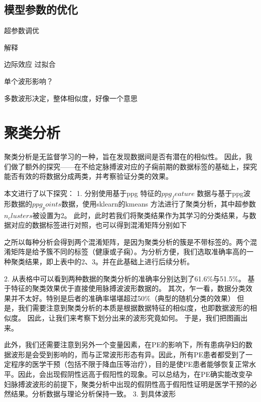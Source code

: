 \subsection{模型参数的优化}



超参数调优


解释

边际效应
过拟合

单个波形影响？

多数波形决定，整体相似度，好像一个意思



\subsection{}



\section{聚类分析}
聚类分析是无监督学习的一种，旨在发现数据间是否有潜在的相似性\cite{Liu2018,Li2017}。
因此，我们做了额外的探究——在不给定脉搏波对应的子痫前期的数据标签的基础上，探究能否有效的将数据分成两类，并考察验证分类的效果。

本文进行了以下探究：
1.	分别使用基于ppg 特征的$ppg_feature$ 数据与基于ppg波形数据的$ppg_points $数据，使用sklearn的kmeans 方法进行了聚类分析，其中超参数$n_clusters$被设置为2。
此时，此时若我们将聚类结果作为其学习的分类结果，与数据对应的数据标签进行对照，也可以得到混淆矩阵分别如下

之所以每种分析会得到两个混淆矩阵，是因为聚类分析的簇是不带标签的。两个混淆矩阵是给予簇不同的标签（健康或子痫）。为分析方便，我们选取准确率高的一种聚类结果，即上表中的2、3。并在此基础上进行后续分析。

2.	从表格中可以看到两种数据的聚类分析的准确率分别达到了61.6\%与51.5\%。
基于特征的聚类效果优于直接使用脉搏波波形数据的。
其次，乍一看，数据分类效果并不太好。特别是后者的准确率堪堪超过50\%（典型的随机分类的效果）
但是，我们需要注意到聚类分析的本质是根据数据特征的相似度，也即数据波形的相似度。
因此，让我们来考察下划分出来的波形究竟如何。
于是，我们把图画出来。

此外，我们还需要注意到另外一个变量因素，在PE的影响下，所有患病孕妇的数据波形是会受到影响的，而与正常波形形态有异。因此，所有PE患者都受到了一定程序的医学干预（包括不限于降血压等治疗），目的是使PE患者能够恢复正常水平。因此，会出现假阴性远高于假阳性的现象。可以总结为，在PE确实能改变孕妇脉搏波波形的前提下，聚类分析中出现的假阴性高于假阳性证明是医学干预的必然结果。分析数据与理论分析保持一致。
3.	到具体波形

